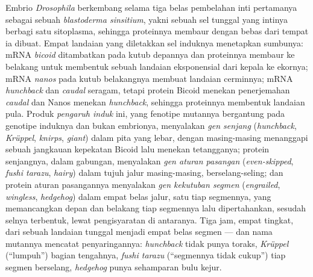 \begin{definition}\label{def:b3:developmental-genetics:hierarchy}
%
Embrio \emph{Drosophila} berkembang selama tiga belas pembelahan inti
pertamanya sebagai sebuah \emph{blastoderma sinsitium}, yakni sebuah sel tunggal yang intinya
berbagi satu sitoplasma, sehingga proteinnya membaur dengan bebas dari tempat ia
dibuat. Empat landaian yang diletakkan sel induknya menetapkan sumbunya:
mRNA \emph{bicoid} ditambatkan pada kutub depannya dan proteinnya
membaur ke belakang untuk membentuk sebuah landaian eksponensial dari kepala ke ekornya;
mRNA \emph{nanos} pada kutub belakangnya membuat landaian cerminnya;
mRNA \emph{hunchback} dan \emph{caudal} seragam, tetapi protein Bicoid
menekan penerjemahan \emph{caudal} dan Nanos menekan
\emph{hunchback}, sehingga proteinnya membentuk landaian pula. Produk
\emph{pengaruh induk} ini, yang fenotipe mutannya bergantung pada
genotipe induknya dan bukan embrionya, menyalakan \emph{gen senjang}
(\emph{hunchback}, \emph{Krüppel}, \emph{knirps}, \emph{giant}) dalam
pita yang lebar, dengan masing-masing menanggapi sebuah jangkauan kepekatan Bicoid lalu
menekan tetangganya; protein senjangnya, dalam gabungan, menyalakan
\emph{gen aturan pasangan} (\emph{even-skipped}, \emph{fushi tarazu},
\emph{hairy}) dalam tujuh jalur masing-masing, berselang-seling; dan protein aturan
pasangannya menyalakan \emph{gen kekutuban segmen} (\emph{engrailed},
\emph{wingless}, \emph{hedgehog}) dalam empat belas jalur, satu tiap segmennya,
yang memancangkan depan dan belakang tiap segmennya lalu dipertahankan, sesudah
selnya terbentuk, lewat pengisyaratan di antaranya. Tiga jam, empat tingkat, dari sebuah
landaian tunggal menjadi empat belas segmen --- dan nama mutannya mencatat
penyaringannya: \emph{hunchback} tidak punya toraks, \emph{Krüppel} (``lumpuh'')
bagian tengahnya, \emph{fushi tarazu} (``segmennya tidak cukup'') tiap segmen
berselang, \emph{hedgehog} punya sehamparan bulu kejur.
\end{definition}

